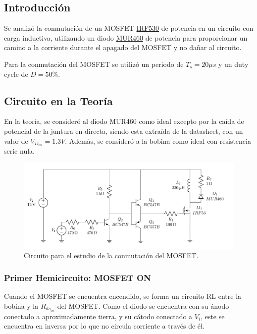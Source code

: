 



\subsection{Introducción}

Se analizó la conmutación de un MOSFET \href{https://www.vishay.com/docs/91019/91019.pdf}{IRF530} de potencia en un circuito con carga inductiva, utilizando un diodo \href{https://www.onsemi.com/pdf/datasheet/mur420-d.pdf}{MUR460} de potencia para proporcionar un camino a la corriente durante el apagado del MOSFET y no dañar al circuito.


Para la conmutación del MOSFET se utilizó un periodo de $T_s = 20 \mu s$ y un duty cycle de $D = 50 \%$.

\subsection{Circuito en la Teoría}

En la teoría, se consideró al diodo MUR460 como ideal excepto por la caída de potencial de la juntura en directa, siendo esta extraída de la datasheet, con un valor de $V_{D_{on}} = 1.3V$. Además, se consideró a la bobina como ideal con resistencia serie nula.

\begin{figure}[H]
	\centering
	\includegraphics[width=0.7\linewidth, page=1]{ImagenesEjercicio-1/CircuitsEj1}
	\caption{Circuito para el estudio de la conmutación del MOSFET.}
	\label{ej1:fig:circuito}
\end{figure}

\subsubsection{Primer Hemicircuito: MOSFET ON}

Cuando el MOSFET se encuentra encendido, se forma un circuito RL entre la bobina y la $R_{ds_{on}}$ del MOSFET. Como el diodo se encuentra con su ánodo conectado a aproximadamente tierra, y su cátodo conectado a $V_i$, este se encuentra en inversa por lo que no circula corriente a través de él.

